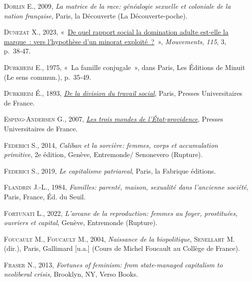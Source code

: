 \documentclass[
  12pt,
]{book}
\newlength{\cslhangindent}
\newenvironment{CSLReferences}[2] %
 {\begin{list}{}{%
  \setlength{\itemindent}{0pt}
  \setlength{\leftmargin}{0pt}
  \setlength{\parsep}{0pt}
  \ifodd #1
   \setlength{\leftmargin}{\cslhangindent}
   \setlength{\itemindent}{-1\cslhangindent}
  \fi
  \setlength{\itemsep}{#2\baselineskip}}}
 {\end{list}}
\begin{document}
\begin{CSLReferences}{0}{1}
\textsc{Dorlin E.}, 2009, \emph{La matrice de la race: généalogie
sexuelle et coloniale de la nation française}, Paris, la Découverte (La
Découverte-poche).

\textsc{Dunezat X.}, 2023,
{«~\href{https://doi.org/10.3917/mouv.115.0038}{De quel rapport social
la domination adulte est-elle la marque~: vers l{'}hypothèse d{'}un
minorat exploité~?}~»}, \emph{Mouvements}, \emph{115}, 3, p.~38‑47.

\textsc{Durkheim E.}, 1975, {«~La famille conjugale~»}, dans Paris, Les
Éditions de Minuit (Le sens commun.), p.~35‑49.

\textsc{Durkheim É.}, 1893,
\emph{\href{https://www.cairn.info/de-la-division-du-travail-social--9782130619574.htm}{De
la division du travail social}}, Paris, Presses Universitaires de
France.

\textsc{Esping-Andersen G.}, 2007,
\emph{\href{https://www.cairn.info/les-trois-mondes-de-l-etat-providence--9782130559160.htm}{Les
trois mondes de l'État-providence}}, Presses Universitaires de France.

\textsc{Federici S.}, 2014, \emph{Caliban et la sorcière: femmes, corps
et accumulation primitive}, 2e édition, Genève, Entremonde/ Senonevero
(Rupture).

\textsc{Federici S.}, 2019, \emph{Le capitalisme patriarcal}, Paris, la
Fabrique éditions.

\textsc{Flandrin J.-L.}, 1984, \emph{Familles: parenté, maison,
sexualité dans l'ancienne société}, Paris, France, Éd. du Seuil.

\textsc{Fortunati L.}, 2022, \emph{L'arcane de la reproduction: femmes
au foyer, prostituées, ouvriers et capital}, Genève, Entremonde
(Rupture).

\textsc{Foucault M.}, \textsc{Foucault M.}, 2004, \emph{Naissance de la
biopolitique}, \textsc{Senellart M.} (dir.), Paris, Gallimard {[}u.a.{]}
(Cours de Michel Foucault au Collège de France).

\textsc{Fraser N.}, 2013, \emph{Fortunes of feminism: from state-managed
capitalism to neoliberal crisis}, Brooklyn, NY, Verso Books.


\end{CSLReferences}
\end{document}
